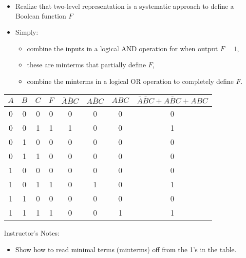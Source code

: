 



\begin{frame}[fragile]
\begin{itemize}
    \item Realize that two-level representation is a systematic approach to define a Boolean function $F$
    \item Simply:
    \begin{itemize}
        \item combine the inputs in a logical AND operation for when output $F=1$, 
        \item these are minterms that partially define $F$,
        \item combine the minterms in a logical OR operation to completely define $F$.
    \end{itemize}
\end{itemize}
\begin{center}
\begin{tabular}{ccc|c||ccc|c}
$A$&$B$&$C$ & $F$ & $\bar A \bar B C $& $A\bar B C$&$ A B C $& $\bar A \bar B C + A\bar B C+ A B C$ \\\hline
0&0&0 & 0 & 0 & 0 & 0 & 0 \\
0&0&1 & 1 & 1 & 0 & 0 & 1 \\
0&1&0 & 0 & 0 & 0 & 0 & 0 \\
0&1&1 & 0 & 0 & 0 & 0 & 0 \\
1&0&0 & 0 & 0 & 0 & 0 & 0 \\
1&0&1 & 1 & 0 & 1 & 0 & 1 \\
1&1&0 & 0 & 0 & 0 & 0 & 0 \\
1&1&1 & 1 & 0 & 0 & 1 & 1 \\
\end{tabular}
\end{center}

\BNotes\ifnum{}
Instructor's Notes:
\begin{itemize}
\item Show how to read minimal terms (minterms) off from the 1's in the table.
\end{itemize}
\fi\ENotes
\end{frame}

